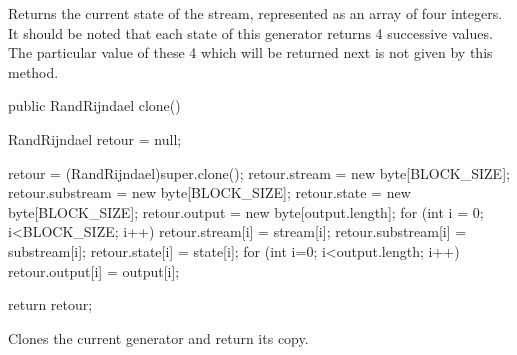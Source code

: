 \begin{tabb} Returns the current state of the stream, represented as an
  array of four integers.
  It should be noted that each state of this generator returns 4 successive
  values. The particular value of these 4 which will be returned next is not
  given by this method.
\end{tabb}
\begin{htmlonly}
\end{htmlonly}
\begin{code}

   public RandRijndael clone() \begin{hide} {
      RandRijndael retour = null;
      
      retour = (RandRijndael)super.clone();
      retour.stream = new byte[BLOCK_SIZE];
      retour.substream = new byte[BLOCK_SIZE];
      retour.state = new byte[BLOCK_SIZE];
      retour.output = new byte[output.length];
      for (int i = 0; i<BLOCK_SIZE; i++) {
         retour.stream[i] = stream[i];
         retour.substream[i] = substream[i];
         retour.state[i] = state[i];
      }
      for (int i=0; i<output.length; i++) {
         retour.output[i] = output[i];
      }

      return retour;
   }\end{hide}
\end{code}
 \begin{tabb} Clones the current generator and return its copy.
 \end{tabb}
 \begin{htmlonly}
\end{htmlonly}
